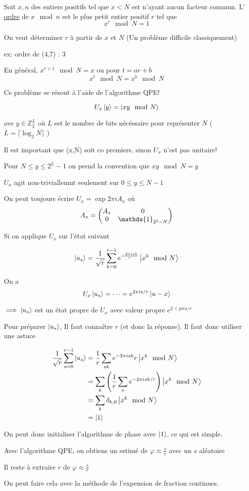 Soit $x,n $ des entiers positifs tel que $x < N$ est n'ayant aucun facteur commun. L' \underline{ordre}  de  $x \mod n$ est le plus petit entier positif $r$ tel que $$x^{r}\mod N = 1$$    

On veut déterminer $r$ à partir  de $x$ et $N$ (Un problème difficile classiquement)  

ex: ordre de (4,7) : 3


En général, $x^{r+1}\mod N = x$ ou pour $t= ar + b$ $$x^{t}\mod N = x^{b}\mod N$$   

Ce problème se résout à l'aide de l'algorithme QPE!

$$U_x \ket{y} = \ket{xy \mod N}$$ 

ave $y\in \mathds{Z}^{L}_2$ où $L$ est le nombre de bits nécéssaire pour représenter $N$ ( $L = \lceil\log_2 N\rceil$  )   

\begin{tcolorbox}[colframe=red]
	 \centering Il est important que (x,N) soit co premiers, sinon $U_x$ n'est pas unitaire! 
\end{tcolorbox}


\begin{tcolorbox}[title=]
	 Pour $N \leq y \leq 2^{L}-1 $ on prend la convention que $xy\mod N =y$ 

	 $U_x$ agit non-triviallemnt seulement sur $0 \leq y \leq N-1 $  
\end{tcolorbox}

On peut toujours écrire $U_x = \exp{2\pi i A_x}$ où $$A_x = \mqty(A_x & 0 \\ 0 & \mathds{1}_{2^2-N} )$$ 

Si on applique $U_x$ sur l'état suivant

$$\ket{u_{s}} = \frac{1}{\sqrt{r}} \sum_{k=0}^{r-1} e^{\frac{-2\pi i s k}{r} } \ket{x^{k}\mod N}$$ 

On a $$U_x \ket{u_{s}} = \dotsb =e^{2\pi is/r}\ket{u-x}$$ 


$\implies \ket{u_{s}}$ est un état propre de $U_x$ avec valeur propre $e^{2<pi i s/r}$ 

Pour préparer $\ket{u_s}$, Il faut connaître $r$ (et donc la réponse). Il faut donc utiliser une astuce

\begin{align*}
	\frac{1}{\sqrt{r}} \sum_{s=0}^{r-1} \ket{u_s} &= \frac{1}{r} \sum_{sk} e^{-2 \pi i sk }{r} \ket{x^{k}\mod N}\\ &= \sum_k \left( \frac{1}{r} \sum_s e^{-2\pi isk/r} \right) \ket{x^{k} \mod N }\\
		&=\sum_k \delta_{k,0} \ket{x^{k}\mod N }  \\
		&= \ket{1}
\end{align*}

On peut donc initialiser l'algorithme de phase avec $\ket{1}$, ce qui est simple.

Avec l'algorithme QPE, on obtiens un estimé de $\varphi \approx \frac{s}{r} $ avec un $s$ aléatoire

Il reste à extraire $r$ de $\varphi \approx \frac{s}{r} $

On peut faire cela avec la méthode de l'expension de fraction continues.


